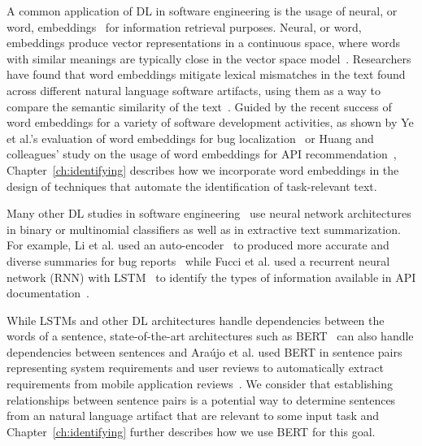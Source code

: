 A common application of \acs{DL} in software engineering is the usage of neural, or word, embeddings~\cite{Mikolov2013}
for information retrieval purposes. 
Neural, or word, embeddings produce vector representations in a continuous space,
where words with similar meanings are typically close in the vector space model~\cite{harris1954distributional, mikolov2013efficient}. 
Researchers have found that word
embeddings mitigate lexical mismatches in the text found across different 
natural language software artifacts,
using them as a way to compare the semantic similarity of the text~\cite{mihalcea2006}.
Guided by the recent success of word embeddings 
for a variety of software development 
activities, as shown by Ye et al.'s evaluation of word embeddings
for bug localization~\cite{Ye2016}
or Huang and colleagues' study on 
the usage of word embeddings for API recommendation~\cite{Huang2018},
Chapter~\ref{ch:identifying} 
describes how we incorporate word embeddings in the 
design of techniques that automate the identification of task-relevant text. 







Many other \acs{DL} studies in software engineering~\cite{ferreira2021,li2018deep, watson2022}
use neural network architectures 
in binary or multinomial classifiers as well as in extractive text summarization.
For example, Li et al. used an auto-encoder~\cite{liou2014autoencoder}
to produced more accurate and diverse summaries 
for bug reports~\cite{li2018deep} while 
Fucci et al. used a 
recurrent neural network (\acs{RNN}) with 
\acf{LSTM}~\cite{hochreiter1997lstm}
to identify the types of information available in 
API documentation~\cite{fucci2019}.


While \acs{LSTM}s and other \acs{DL} architectures 
handle dependencies between the words of a sentence, 
state-of-the-art architectures such as \acf{BERT}~\cite{Devlin2018Bert}
can also handle dependencies between sentences
and Ara{\'u}jo et al. used \acs{BERT} in sentence pairs 
representing system requirements and user reviews 
to automatically extract requirements from 
mobile application reviews~\cite{Araujo2021}.
We consider that 
establishing relationships 
between sentence pairs is 
a potential way to determine 
sentences from an natural language artifact 
that are relevant to some input task 
and Chapter~\ref{ch:identifying}
further describes how 
we use \acs{BERT} for this goal.

